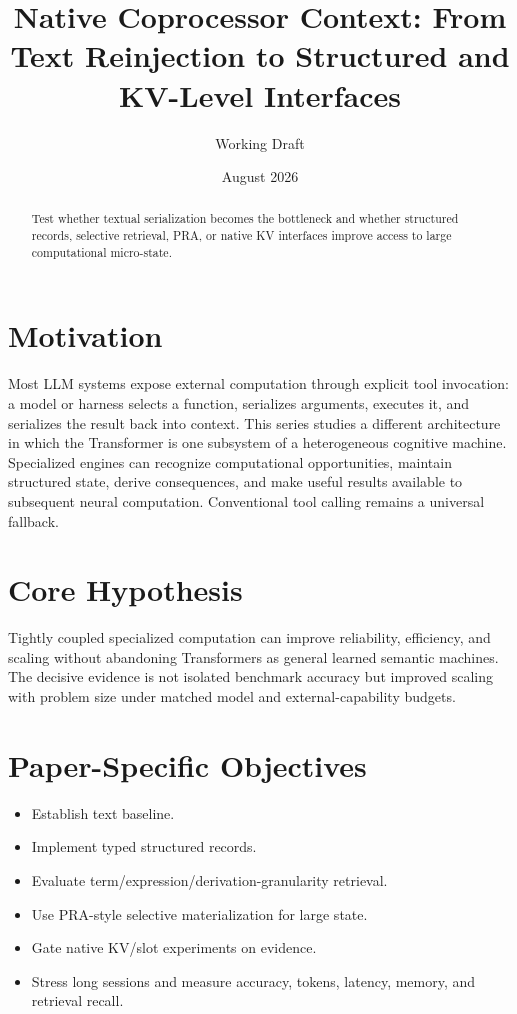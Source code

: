 \documentclass[11pt]{article}
\title{Native Coprocessor Context: From Text Reinjection to Structured and KV-Level Interfaces}
\author{Working Draft}
\date{August 2026}
\begin{document}
\maketitle
\begin{abstract}
Test whether textual serialization becomes the bottleneck and whether structured records, selective retrieval, PRA, or native KV interfaces improve access to large computational micro-state.
\end{abstract}

\section{Motivation}
Most LLM systems expose external computation through explicit tool invocation: a model or harness selects a function, serializes arguments, executes it, and serializes the result back into context. This series studies a different architecture in which the Transformer is one subsystem of a heterogeneous cognitive machine. Specialized engines can recognize computational opportunities, maintain structured state, derive consequences, and make useful results available to subsequent neural computation. Conventional tool calling remains a universal fallback.

\section{Core Hypothesis}
Tightly coupled specialized computation can improve reliability, efficiency, and scaling without abandoning Transformers as general learned semantic machines. The decisive evidence is not isolated benchmark accuracy but improved scaling with problem size under matched model and external-capability budgets.

\section{Paper-Specific Objectives}
\begin{itemize}
\item Establish text baseline.
\item Implement typed structured records.
\item Evaluate term/expression/derivation-granularity retrieval.
\item Use PRA-style selective materialization for large state.
\item Gate native KV/slot experiments on evidence.
\item Stress long sessions and measure accuracy, tokens, latency, memory, and retrieval recall.
\end{itemize}
\end{document}
